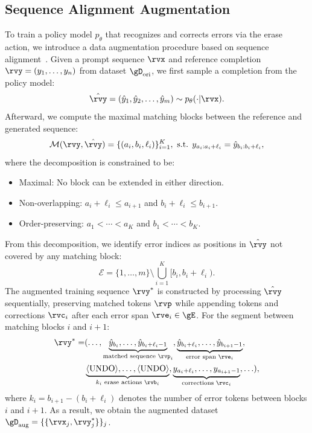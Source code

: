\subsection{Sequence Alignment Augmentation} \label{sec: sequence augmentation}
To train a policy model $p_\theta$ that recognizes and corrects errors via the erase action, we introduce a data augmentation procedure based on sequence alignment~\cite{myers1986nd}.
Given a prompt sequence $\rvx$ and reference completion $\rvy = (y_1, \ldots, y_n)$ from dataset $\gD_\text{ori}$, we first sample a completion from the policy model:
\begin{equation}
    \hat{\rvy} = (\hat{y}_1, \hat{y}_2, \ldots, \hat{y}_m) \sim p_\theta(\cdot | \rvx).
\end{equation}
Afterward, we compute the maximal matching blocks between the reference and generated sequence:
\begin{equation}
     \mathcal{M}(\rvy, \hat{\rvy}) = \{(a_i, b_i, \ell_i)\}_{i=1}^{K}, \text{ s.t. } y_{a_i : a_i + \ell_i} = \hat{y}_{b_i : b_i + \ell_i},
\end{equation}
where the decomposition is constrained to be:
\begin{itemize}[leftmargin=*, noitemsep, topsep=-1pt]
    \item Maximal: No block can be extended in either direction.
    \item Non-overlapping: $a_i + \ell_i \leq a_{i+1}$ and $b_i + \ell_i \leq b_{i+1}$.
    \item Order-preserving: $a_1 < \cdots < a_K$ and $b_1 < \cdots < b_K$.
\end{itemize}
From this decomposition, we identify error indices as positions in $\hat{\rvy}$ not covered by any matching block:
\begin{equation}
    \mathcal{E} = \{1, \ldots, m\} \setminus \bigcup_{i=1}^{K} [b_i, b_i + \ell_i).
\end{equation}
The augmented training sequence $\rvy^*$ is constructed by processing $\hat{\rvy}$ sequentially, preserving matched tokens $\rvp$ while appending tokens \bk and corrections $\rvc_i$ after each error span $\rve_i \in \gE$. For the segment between matching blocks $i$ and $i+1$:
\begin{align} \label{eq: gold label}
    \rvy^* = & (\ldots, \underbrace{\hat{y}_{b_i}, \ldots, \hat{y}_{b_i + \ell_i - 1}}_{\text{matched sequence } \rvp_i}, \underbrace{\hat{y}_{b_i + \ell_i}, \ldots, \hat{y}_{b_{i+1} - 1}}_{\text{error span } \rve_i}, \notag \\
    &\underbrace{
       \bk , \ldots, \bk
    }_{\text{$k_i$ erase actions } \rvb_i}, \underbrace{y_{a_i + \ell_i}, \ldots, y_{a_{i+1} - 1}}_{\text{corrections } \rvc_i}, \ldots),
\end{align}
where $k_i = b_{i+1} - (b_i + \ell_i)$ denotes the number of error tokens between blocks $i$ and $i+1$.
As a result, we obtain the augmented dataset $\gD_\text{aug} = \{\{\rvx_j, \rvy^*_j\}\}_j$.

